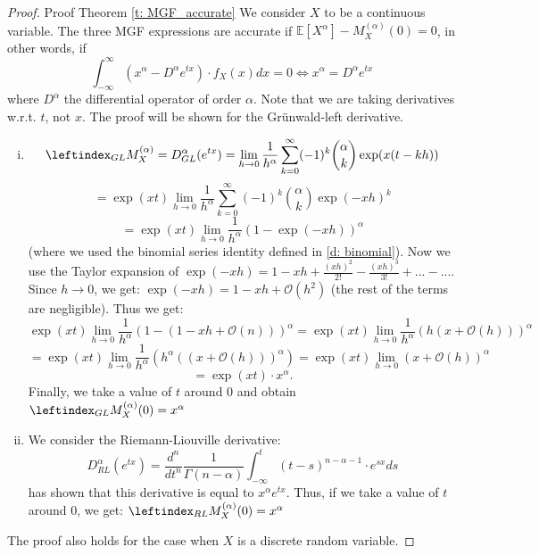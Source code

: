 \begin{proof}
    Proof Theorem \ref{t: MGF_accurate}
    We consider \(X\) to be a continuous variable. The three MGF expressions are accurate if \(\mathbb{E}[X^\alpha] - M_X^{(\alpha)}(0) = 0\), in other words, if 
    \[\int_{-\infty}^{\infty} (x^\alpha - D^\alpha e^{tx}) \cdot f_X(x) dx = 0 \iff x^\alpha = D^\alpha e^{tx}\]
    where \(D^\alpha\) the differential operator of order \(\alpha\). Note that we are taking derivatives w.r.t. \(t\), not \(x\). The proof will be shown for the Grünwald-left derivative.
    \begin{enumerate}[(i)]
        \item \[\leftindex_{GL}{M}_X^{(\alpha)} = D^\alpha_{GL}(e^{tx})  = \lim_{h \to 0} \frac{1}{h^\alpha} \sum_{k=0}^\infty (-1)^k \binom{\alpha}{k} \exp(x(t - kh))\]
        \[= \exp(xt) \lim_{h \to 0} \frac{1}{h^\alpha} \sum_{k=0}^\infty (-1)^k \binom{\alpha}{k} \exp(-xh)^k\]
        \[= \exp(xt) \lim_{h \to 0} \frac{1}{h^\alpha} (1 - \exp(-xh))^\alpha\]
        (where we used the binomial series identity defined in \ref{d: binomial}). Now we use the Taylor expansion of \(\exp(-xh) = 1 - xh + \frac{(xh)^2}{2!} - \frac{(xh)^3}{3!} + ... - ...\). Since \(h \to 0\), we get: \(\exp(-xh) = 1 - xh + \mathcal{O}(h^2)\) (the rest of the terms are negligible).
        Thus we get:
        \[ \exp(xt) \lim_{h \to 0} \frac{1}{h^\alpha} \left(1 -(1 - xh + \mathcal{O}(n))\right)^\alpha = \exp(xt) \lim_{h \to 0} \frac{1}{h^\alpha} \left(h(x + \mathcal{O}(h))\right)^\alpha \]
        \[ = \exp(xt) \lim_{h \to 0} \frac{1}{h^\alpha} \left(h^\alpha((x + \mathcal{O}(h)))^\alpha\right) = \exp(xt) \lim_{h \to 0} (x + \mathcal{O}(h))^\alpha\]
        \[ = \exp(xt) \cdot x^\alpha.\]
        Finally, we take a value of \(t\) around 0 and obtain \(\leftindex_{GL}{M}_X^{(\alpha)}(0) = x^\alpha\) 
        \item We consider the Riemann-Liouville derivative: 
        \[D_{RL}^\alpha(e^{tx}) = \frac{d^n}{dt^n} \frac{1}{\Gamma(n -\alpha)}  \int_{-\infty}^{t} (t-s)^{n - \alpha-1} \cdot e^{sx} ds\]
        \cite{koning15} has shown that this derivative is equal to \(x^\alpha e^{tx}\). Thus, if we take a value of \(t\) around 0, we get: \(\leftindex_{RL}{M}_X^{(\alpha)}(0) = x^\alpha\)
    \end{enumerate}

    The proof also holds for the case when \(X\) is a discrete random variable.
\end{proof}

